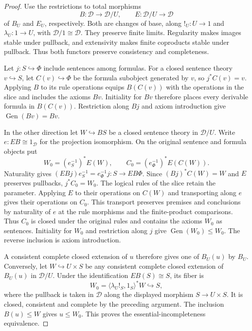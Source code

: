 \begin{proof}
Use the restrictions to total morphisms
\[
 B:\mathcal D\to\mathcal D/U,\qquad E:\mathcal D/U\to\mathcal D
\]
of $B_U$ and $E_U$, respectively. Both are changes of base, along
$!_U:U\to1$ and $\lambda_U:1\to U$, with $\mathcal D/1\cong\mathcal D$.
They preserve finite limits. Regularity makes images stable under pullback,
and extensivity makes finite coproducts stable under pullback. Thus
both functors preserve consistency and completeness.

Let $j:S\hookrightarrow\Phi$ include sentences among formulas.
For a closed sentence theory $v\hookrightarrow S$, let
$C(v)\hookrightarrow\Phi$ be the formula subobject generated by $v$,
so $j^*C(v)=v$. Applying $B$ to its rule operations equips $B(C(v))$
with the operations in the slice and includes the axioms $Bv$.
Initiality for $Bv$ therefore places every derivable formula in $B(C(v))$.
Restriction along $Bj$ and axiom introduction give
$\operatorname{Gen}(Bv)=Bv$.

In the other direction let $W\hookrightarrow BS$ be a closed sentence
theory in $\mathcal D/U$. Write $e:EB\cong1_{\mathcal D}$ for the
projection isomorphism. On the original sentence and formula objects put
\[
 W_0=(e_S^{-1})^*E(W),\qquad C_0=(e_\Phi^{-1})^*E(C(W)).
\]
Naturality gives $(EBj)e_S^{-1}=e_\Phi^{-1}j:S\to EB\Phi$.
Since $(Bj)^*C(W)=W$ and $E$ preserves pullbacks, $j^*C_0=W_0$.
The logical rules of the slice retain the parameter. Applying $E$ to
their operations on $C(W)$ and transporting along $e$ gives their
operations on $C_0$. This transport preserves premises and conclusions
by naturality of $e$ at the rule morphisms and the finite-product
comparisons. Thus $C_0$ is closed under the original rules and contains
the axioms $W_0$ as sentences. Initiality for $W_0$ and restriction along
$j$ give $\operatorname{Gen}(W_0)\leq W_0$. The reverse inclusion is
axiom introduction.

A consistent complete closed extension of $u$ therefore gives one of
$B_U(u)$ by $B_U$. Conversely, let $W\hookrightarrow U\times S$ be any consistent
complete closed extension of $B_U(u)$ in $\mathcal D/U$. Under
the identification $E B(S)\cong S$, its fiber is
\[
 W_0=\langle\lambda_U !_S,1_S\rangle^*W\hookrightarrow S ,
\]
where the pullback is taken in $\mathcal D$ along the displayed morphism
$S\to U\times S$. It is closed, consistent and complete by the
preceding argument. The inclusion $B(u)\leq W$ gives $u\leq W_0$.
This proves the essential-incompleteness equivalence.


\end{proof}
